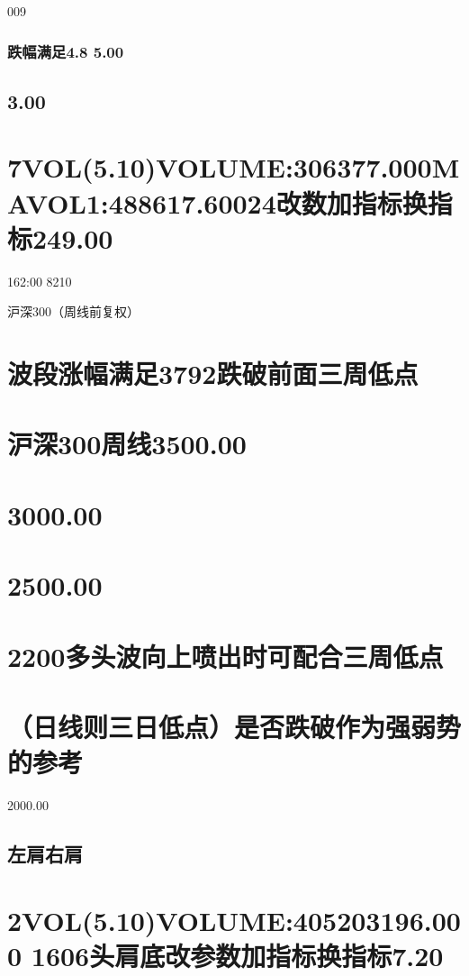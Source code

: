 \documentclass{article}
\begin{document}
009

\subsubsection{跌幅满足4.8 5.00}

\subsection{3.00}

\section{7VOL(5.10)VOLUME:306377.000MAVOL1:488617.60024改数加指标换指标249.00}

162:00 8210

沪深300（周线前复权）

\section{波段涨幅满足3792跌破前面三周低点}

\section{沪深300周线3500.00}

\section{3000.00}

\section{2500.00}

\section{2200多头波向上喷出时可配合三周低点}

\section{（日线则三日低点）是否跌破作为强弱势的参考}

2000.00

\subsection{左肩右肩}

\section{2VOL(5.10)VOLUME:405203196.000 1606头肩底改参数加指标换指标7.20}
\end{document}
